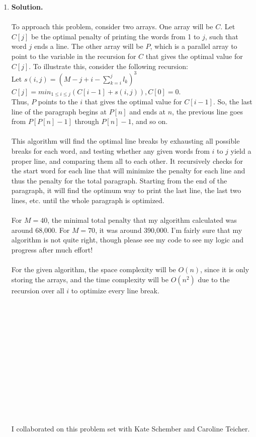 \documentclass[11pt]{article}
\newcommand\solution{%
  \textbf{Solution.}\\%
}
\begin{document}
\begin{enumerate}
\item 

\solution \\
To approach this problem, consider two arrays. One array will be $C$. Let $C[j]$ be the optimal penalty of printing the words from 1 to $j$, such that word $j$ ends a line. The other array will be $P$, which is a parallel array to point to the variable in the recursion for $C$ that gives the optimal value for $C[j]$. To illustrate this, consider the following recursion: \\
Let $s(i,j) = (M - j + i - \sum_{k=i}^j l_k)^3$ \\
$C[j] = min_{1 \leq i \leq j}(C[i-1] + s(i,j)), C[0] = 0$. \\
Thus, $P$ points to the $i$ that gives the optimal value for $C[i-1]$. So, the last line of the paragraph begins at $P[n]$ and ends at $n$, the previous line goes from $P[P[n]-1]$ through $P[n] - 1$, and so on. \\
\\
This algorithm will find the optimal line breaks by exhausting all possible breaks for each word, and testing whether any given words from $i$ to $j$ yield a proper line, and comparing them all to each other. It recursively checks for the start word for each line that will minimize the penalty for each line and thus the penalty for the total paragraph. Starting from the end of the paragraph, it will find the optimum way to print the last line, the last two lines, etc. until the whole paragraph is optimized. \\
\\
For $M = 40$, the minimal total penalty that my algorithm calculated was around 68,000. For $M = 70$, it was around 390,000. I'm fairly sure that my algorithm is not quite right, though please see my code to see my logic and progress after much effort! \\
\\
For the given algorithm, the space complexity will be $O(n)$, since it is only storing the arrays, and the time complexity will be $O(n^2)$ due to the recursion over all $i$ to optimize every line break. \\\\\\\\\\\\\\\\\\\\\\\\\\\\

I collaborated on this problem set with Kate Schember and Caroline Teicher.


\end{enumerate}
\end{document}

